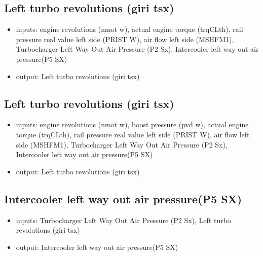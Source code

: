 

\subsection{Left turbo revolutions (giri tsx)}
\begin{itemize}
	\item{inputs: engine revolutions (nmot w), actual engine torque (trqCLth), rail pressure real value left side (PRIST W), air flow left side (MSHFM1), Turbocharger Left Way Out Air Pressure (P2 Sx), Intercooler left way out air pressure(P5 SX)}
	\item{output: Left turbo revolutions (giri tsx)}
\end{itemize}	



\subsection{Left turbo revolutions (giri tsx)}
\begin{itemize}
	\item{inputs: engine revolutions (nmot w), boost pressure (pvd w), actual engine torque (trqCLth), rail pressure real value left side (PRIST W), air flow left side (MSHFM1), Turbocharger Left Way Out Air Pressure (P2 Sx), Intercooler left way out air pressure(P5 SX)}
	\item{output: Left turbo revolutions (giri tsx)}
\end{itemize}	




\subsection{Intercooler left way out air pressure(P5 SX)}
\begin{itemize}
	\item{inputs: Turbocharger Left Way Out Air Pressure (P2 Sx), Left turbo revolutions (giri tsx)}
	\item{output: Intercooler left way out air pressure(P5 SX)}
\end{itemize}	




